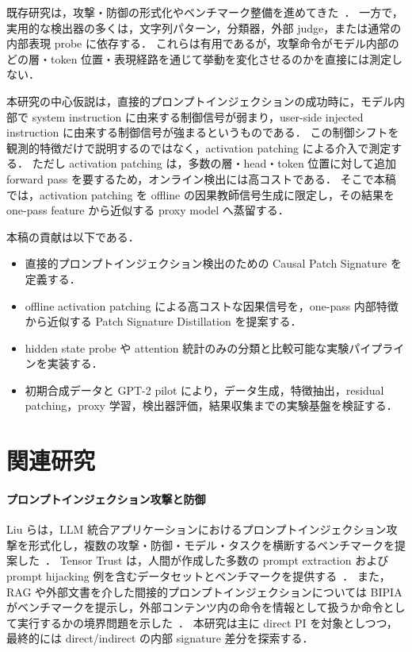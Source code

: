 \documentclass[11pt,a4paper]{ltjsarticle}
\begin{document}
既存研究は，攻撃・防御の形式化やベンチマーク整備を進めてきた~\cite{liu2023formalizing,toyer2023tensortrust,yi2023bipia}．
一方で，実用的な検出器の多くは，文字列パターン，分類器，外部 judge，または通常の内部表現 probe に依存する．
これらは有用であるが，攻撃命令がモデル内部のどの層・token 位置・表現経路を通じて挙動を変化させるのかを直接には測定しない．

本研究の中心仮説は，直接的プロンプトインジェクションの成功時に，モデル内部で system instruction に由来する制御信号が弱まり，user-side injected instruction に由来する制御信号が強まるというものである．
この制御シフトを観測的特徴だけで説明するのではなく，activation patching による介入で測定する．
ただし activation patching は，多数の層・head・token 位置に対して追加 forward pass を要するため，オンライン検出には高コストである．
そこで本稿では，activation patching を offline の因果教師信号生成に限定し，その結果を one-pass feature から近似する proxy model へ蒸留する．

本稿の貢献は以下である．
\begin{itemize}
  \item 直接的プロンプトインジェクション検出のための Causal Patch Signature を定義する．
  \item offline activation patching による高コストな因果信号を，one-pass 内部特徴から近似する Patch Signature Distillation を提案する．
  \item hidden state probe や attention 統計のみの分類と比較可能な実験パイプラインを実装する．
  \item 初期合成データと GPT-2 pilot により，データ生成，特徴抽出，residual patching，proxy 学習，検出器評価，結果収集までの実験基盤を検証する．
\end{itemize}

\section{関連研究}
\paragraph{プロンプトインジェクション攻撃と防御}
Liu らは，LLM 統合アプリケーションにおけるプロンプトインジェクション攻撃を形式化し，複数の攻撃・防御・モデル・タスクを横断するベンチマークを提案した~\cite{liu2023formalizing}．
Tensor Trust は，人間が作成した多数の prompt extraction および prompt hijacking 例を含むデータセットとベンチマークを提供する~\cite{toyer2023tensortrust}．
また，RAG や外部文書を介した間接的プロンプトインジェクションについては BIPIA がベンチマークを提示し，外部コンテンツ内の命令を情報として扱うか命令として実行するかの境界問題を示した~\cite{yi2023bipia}．
本研究は主に direct PI を対象としつつ，最終的には direct/indirect の内部 signature 差分を探索する．
\end{document}
